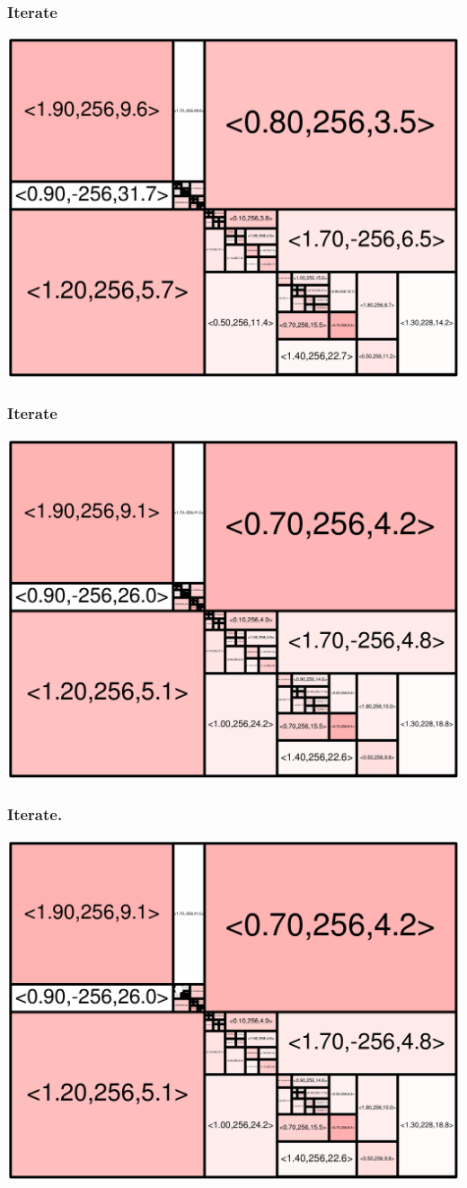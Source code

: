 \begin{frame}
\frametitle{Iterate}\begin{centering}\includegraphics[width=8.5 cm]{remy-graph/graph/test81.pdf}

\end{centering}\end{frame}


\begin{frame}
\frametitle{Iterate}\begin{centering}\includegraphics[width=8.5 cm]{remy-graph/graph/test82.pdf}

\end{centering}\end{frame}


\begin{frame}
\frametitle{Iterate\hspace{10 cm}.}\begin{centering}\includegraphics[width=8.5 cm]{remy-graph/graph/test83.pdf}

\end{centering}\end{frame}


